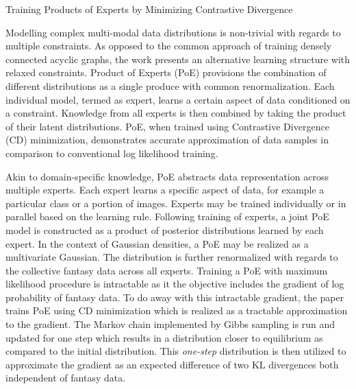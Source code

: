 \documentclass[11pt,letterpaper]{article}
\begin{document}
\begin{center}
  \large{Training Products of Experts by Minimizing Contrastive Divergence}
\end{center}

Modelling complex multi-modal data distributions is non-trivial with regards to multiple constraints. As opposed to the common approach of training densely connected acyclic graphs, the work presents an alternative learning structure with relaxed constraints. Product of Experts (PoE) provisions the combination of different distributions as a single produce with common renormalization. Each individual model, termed as expert, learns a certain aspect of data conditioned on a constraint. Knowledge from all experts is then combined by taking the product of their latent distributions. PoE, when trained using Contrastive Divergence (CD) minimization, demonstrates accurate approximation of data samples in comparison to conventional log likelihood training. 

Akin to domain-specific knowledge, PoE abstracts data representation across multiple experts. Each expert learns a specific aspect of data, for example a particular class or a portion of images. Experts may be trained individually or in parallel based on the learning rule. Following training of experts, a joint PoE model is constructed as a product of posterior distributions learned by each expert. In the context of Gaussian densities, a PoE may be realized as a multivariate Gaussian. The distribution is further renormalized with regards to the collective fantasy data across all experts. Training a PoE with maximum likelihood procedure is intractable as it the objective includes the gradient of log probability of fantasy data. To do away with this intractable gradient, the paper trains PoE using CD minimization which is realized as a tractable approximation to the gradient. The Markov chain implemented by Gibbs sampling is run and updated for one step which results in a distribution closer to equilibrium as compared to the initial distribution. This \textit{one-step} distribution is then utilized to approximate the gradient as an expected difference of two KL divergences both independent of fantasy data. 
\end{document}
